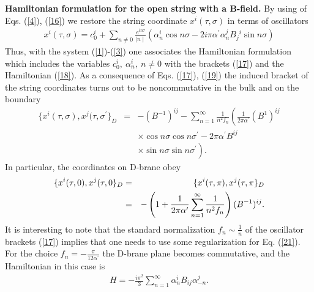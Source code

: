 \documentclass[a4paper]{article}
\begin{document}
\noindent
{\bf Hamiltonian formulation for the open string with a B-field.}
By using of Eqs. (\ref{4}), (\ref{16}) we restore the string coordinate 
$x^i(\tau, \sigma)$ in terms of oscillators 
\begin{eqnarray}\label{19}
x^i(\tau, \sigma)=c_0^i+\sum_{n\ne 0}\frac{e^{in\tau}}{\mid n\mid}
\left(\alpha_n^i\cos n\sigma-
2i\pi\alpha^\prime\alpha_n^jB_j{}^i\sin n\sigma\right)  
\end{eqnarray}
Thus, with the system (\ref{1})-(\ref{3}) one associates the 
Hamiltonian formulation which includes the variables 
$c_0^i, ~ \alpha_n^i, ~ 
n\ne 0$ with the brackets (\ref{17}) and the Hamiltonian (\ref{18}).
As a consequence of Eqs. (\ref{17}), (\ref{19})  
the induced bracket of the string coordinates turns out to be 
noncommutative in the bulk and on the boundary 
\begin{eqnarray}\label{20}
\lbrace x^i(\tau, \sigma), x^j(\tau, \sigma^\prime\rbrace_D&=&-(B^{-1})^{ij}-  
\sum_{n=1}^\infty\frac{1}{n^2f_n}\left(\frac{1}{2\pi\alpha^\prime}(B^{1})^{ij} \right. \nonumber \\
&& \left. \times \cos n\sigma\cos n\sigma^\prime - 2\pi\alpha^\prime B^{ij}\right. \nonumber \\
&& \left. \times \sin n\sigma\sin n\stackrel{~}{\sigma^\prime}\right).
\end{eqnarray}
In particular, the coordinates on D-brane obey
\begin{eqnarray}\label{21}
\{x^i(\tau, 0), x^j(\tau, 0\}_D=&&
\{x^i(\tau, \pi), x^j(\tau, \pi\}_D \cr 
=&&-\left(1+\frac{1}{2\pi\alpha^\prime}
\sum_{n=1}^\infty\frac{1}{n^2f_n}\right)(B^{-1})^{ij}.
\end{eqnarray}
It is interesting to note that the standard normalization 
$f_n\sim\frac{1}{n}$ of the oscillator brackets (\ref{17}) implies 
that one needs to use some regularization for Eq. (\ref{21}). 
For the choice $f_n=-\frac{\pi}{12\alpha^\prime}$ the D-brane plane 
becomes commutative, and the Hamiltonian in this case is 
\begin{eqnarray}\label{22}
H=-\frac{i\pi^2}{3}\sum_{n=1}^\infty\alpha_n^iB_{ij}\alpha_{-n}^j.
\end{eqnarray}
\end{document}
